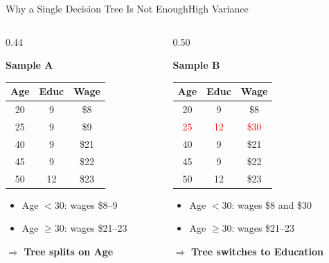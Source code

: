 \documentclass[hyperref={pdfpagelabels=false}]{beamer}
\begin{document}
\begin{frame}{Why a Single Decision Tree Is Not Enough}{High Variance}
\begin{columns}[T]

\begin{column}{0.44\textwidth}
  \begin{center}\textbf{Sample A}\end{center}
  \begin{center}\small
  \begin{tabular}{@{}ccc@{}}
    \toprule
    Age & Educ & Wage \\
    \midrule
    20 &  9 & \$8  \\
    25 &  9 & \$9  \\
    40 &  9 & \$21 \\
    45 &  9 & \$22 \\
    50 & 12 & \$23 \\
    \bottomrule
  \end{tabular}
  \end{center}
  \begin{itemize}\small
    \item Age $<30$: wages \$8--9
          \vspace{0.1cm}
    \item Age $\geq30$: wages \$21--23
  \end{itemize}
  \vspace{0.1cm}
  $\Rightarrow$ \textbf{Tree splits on Age}
\end{column}
\hfill
\begin{column}{0.50\textwidth}
  \begin{center}\textbf{Sample B}\end{center}
  \begin{center}\small
  \begin{tabular}{@{}ccc@{}}
    \toprule
    Age & Educ & Wage \\
    \midrule
    20 &  9 & \$8                  \\
    \textcolor{red}{25} & \textcolor{red}{12} & \textcolor{red}{\$30} \\
    40 &  9 & \$21                 \\
    45 &  9 & \$22                 \\
    50 & 12 & \$23                 \\
    \bottomrule
  \end{tabular}
  \end{center}
  \begin{itemize}\small
    \item Age $<30$: wages \$8 and \$30 
          \vspace{0.1cm}
    \item Age $\geq30$: wages \$21--23
  \end{itemize}
  \vspace{0.1cm}
  $\Rightarrow$ \textbf{Tree switches to Education}
\end{column}
\end{columns}
\end{frame}
\end{document}
